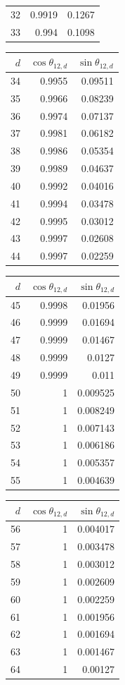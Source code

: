 {\begin{tabular}[t]{r|rr}
32 & 0.9919 & 0.1267 \\
33 & 0.994 & 0.1098
\end{tabular}\kern4pt
\begin{tabular}[t]{r|rr}
$d$ & $\cos\theta_{12,d}$ & $\sin\theta_{12,d}$ \\\hline
34 & 0.9955 & 0.09511 \\
35 & 0.9966 & 0.08239 \\
36 & 0.9974 & 0.07137 \\
37 & 0.9981 & 0.06182 \\
38 & 0.9986 & 0.05354 \\
39 & 0.9989 & 0.04637 \\
40 & 0.9992 & 0.04016 \\
41 & 0.9994 & 0.03478 \\
42 & 0.9995 & 0.03012 \\
43 & 0.9997 & 0.02608 \\
44 & 0.9997 & 0.02259
\end{tabular}\kern4pt
\begin{tabular}[t]{r|rr}
$d$ & $\cos\theta_{12,d}$ & $\sin\theta_{12,d}$ \\\hline
45 & 0.9998 & 0.01956 \\
46 & 0.9999 & 0.01694 \\
47 & 0.9999 & 0.01467 \\
48 & 0.9999 & 0.0127 \\
49 & 0.9999 & 0.011 \\
50 & 1 & 0.009525 \\
51 & 1 & 0.008249 \\
52 & 1 & 0.007143 \\
53 & 1 & 0.006186 \\
54 & 1 & 0.005357 \\
55 & 1 & 0.004639
\end{tabular}\kern4pt
\begin{tabular}[t]{r|rr}
$d$ & $\cos\theta_{12,d}$ & $\sin\theta_{12,d}$ \\\hline
56 & 1 & 0.004017 \\
57 & 1 & 0.003478 \\
58 & 1 & 0.003012 \\
59 & 1 & 0.002609 \\
60 & 1 & 0.002259 \\
61 & 1 & 0.001956 \\
62 & 1 & 0.001694 \\
63 & 1 & 0.001467 \\
64 & 1 & 0.00127
\end{tabular}}

